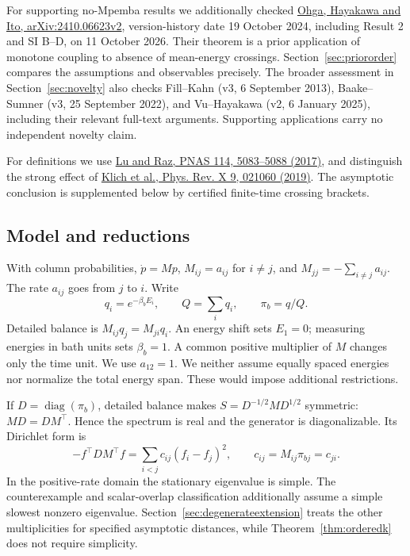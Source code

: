\documentclass[11pt]{article}
\newcommand{\diag}{\operatorname{diag}}
\begin{document}
For supporting no-Mpemba results we additionally checked \href{https://arxiv.org/html/2410.06623v2}{Ohga, Hayakawa and Ito, arXiv:2410.06623v2}, version-history date 19 October 2024, including Result 2 and SI B--D, on 11 October 2026. Their theorem is a prior application of monotone coupling to absence of mean-energy crossings. Section~\ref{sec:priororder} compares the assumptions and observables precisely. The broader assessment in Section~\ref{sec:novelty} also checks Fill--Kahn (v3, 6 September 2013), Baake--Sumner (v3, 25 September 2022), and Vu--Hayakawa (v2, 6 January 2025), including their relevant full-text arguments. Supporting applications carry no independent novelty claim.

For definitions we use \href{https://pmc.ncbi.nlm.nih.gov/articles/PMC5441807/}{Lu and Raz, PNAS 114, 5083--5088 (2017)}, and distinguish the strong effect of \href{https://arxiv.org/abs/1711.05829}{Klich et al., Phys. Rev. X 9, 021060 (2019)}. The asymptotic conclusion is supplemented below by certified finite-time crossing brackets.

\subsection{Model and reductions}
With column probabilities, $\dot p=Mp$, $M_{ij}=a_{ij}$ for $i\ne j$, and $M_{jj}=-\sum_{i\ne j}a_{ij}$. The rate $a_{ij}$ goes from $j$ to $i$. Write
\[
q_i=e^{-\beta_b E_i},\qquad Q=\sum_iq_i,\qquad \pi_b=q/Q.
\]
Detailed balance is $M_{ij}q_j=M_{ji}q_i$. An energy shift sets $E_1=0$; measuring energies in bath units sets $\beta_b=1$. A common positive multiplier of $M$ changes only the time unit. We use $a_{12}=1$. We neither assume equally spaced energies nor normalize the total energy span. These would impose additional restrictions.

If $D=\diag(\pi_b)$, detailed balance makes $S=D^{-1/2}MD^{1/2}$ symmetric: $MD=DM^\top$. Hence the spectrum is real and the generator is diagonalizable. Its Dirichlet form is
\[
-f^\top D M^\top f=\sum_{i<j}c_{ij}(f_i-f_j)^2,\qquad c_{ij}=M_{ij}\pi_{bj}=c_{ji}.
\]
In the positive-rate domain the stationary eigenvalue is simple. The counterexample and scalar-overlap classification additionally assume a simple slowest nonzero eigenvalue. Section~\ref{sec:degenerateextension} treats the other multiplicities for specified asymptotic distances, while Theorem~\ref{thm:orderedk} does not require simplicity.
\end{document}
